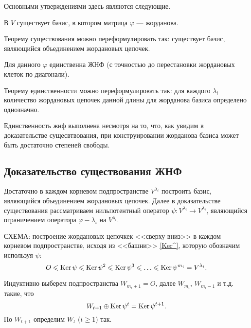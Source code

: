 Основными утверждениями здесь являются следующие.

\begin{theor}
В $V$ существует базис, в котором матрица $\varphi$ --- жорданова.
\end{theor}

Теорему существования можно переформулировать так: существует базис, являющийся объединением жордановых цепочек.

\begin{theor}
Для данного $\varphi$ единственна ЖНФ  (с точностью до перестановки жордановых клеток по диагонали).
\end{theor}

Теорему единственности можно переформулировать так: 
 для каждого $\lambda _i$ количество жордановых цепочек данной длины 
для жорданова базиса определено однозначно.


Единственность жнф выполнена несмотря на то, что, 
как увидим в доказательстве сущесвтвования, 
при конструировании жорданова базиса может быть достаточно степеней свободы.



\subsection{Доказательство существования ЖНФ}

Достаточно в каждом корневом подпространстве $V^{\lambda_i}$ построить базис,
являющийся объединением жордановых цепочек. Далее в доказательстве существования
рассматриваем нильпотентный оператор $\psi : V^{\lambda_i} \to V^{\lambda_i}$, 
являющийся ограничением оператора $\varphi - \lambda_i$ на $V^{\lambda_i}$.

\otstup

СХЕМА: построение жордановых цепочкек <<сверху вниз>> в каждом корневом подпространстве,
исходя из <<башни>>  \ref{Ker^}, которую обозначим используя $\psi$:
\begin{equation} %
O\leq  \Ker \psi \leq \Ker \psi ^2 \leq 
\Ker \psi  ^3 \leq \ldots  \leq \Ker \psi  ^{m_i} = V^{\lambda_i}.
\end{equation}


Индуктивно выберем подпространства $W_{m_i+1}=O$, далее $W_{m_i}$,  $W_{m_i-1}$ и т.д.
такие, что 
\begin{equation} \label{Woplus}
W_{t+1} \oplus \mathop{\rm Ker}\nolimits \psi ^t = \mathop{\rm Ker}\nolimits \psi ^{t+1}.
\end{equation}
По $W_{t+1}$ определим $W_t$ ($t\geq 1$) так. 

